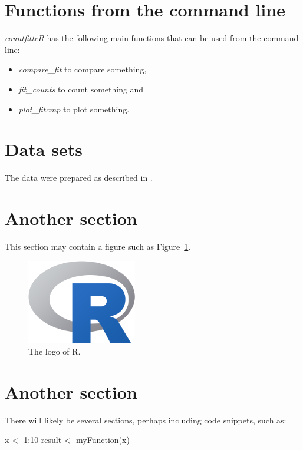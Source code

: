 \section{Functions from the command line}

\emph{countfitteR} has the following main functions that can
be used from the command line:

\begin{itemize}
    \item \textit{compare\_fit} to compare something,
    \item \textit{fit\_counts} to count something and
    \item \textit{plot\_fitcmp} to plot something.
\end{itemize}


\section{Data sets}

The data were prepared as described in \citep{rodiger_quantification_2018}.

\section{Another section}

This section may contain a figure such as Figure~\ref{figure:rlogo}.

\begin{figure}[htbp]
  \centering
  \includegraphics{Rlogo-5}
  \caption{The logo of R.}
  \label{figure:rlogo}
\end{figure}

\section{Another section}

There will likely be several sections, perhaps including code snippets, such as:

\begin{example}
  x <- 1:10
  result <- myFunction(x)
\end{example}

